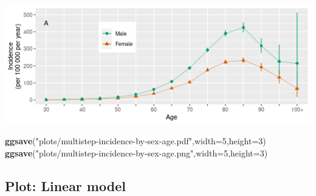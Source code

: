 \documentclass[
]{article}
\newenvironment{Shaded}{\begin{snugshade}}{\end{snugshade}}
\newcommand{\DataTypeTok}[1]{\textcolor[rgb]{0.13,0.29,0.53}{#1}}
\newcommand{\DecValTok}[1]{\textcolor[rgb]{0.00,0.00,0.81}{#1}}
\newcommand{\KeywordTok}[1]{\textcolor[rgb]{0.13,0.29,0.53}{\textbf{#1}}}
\newcommand{\NormalTok}[1]{#1}
\newcommand{\StringTok}[1]{\textcolor[rgb]{0.31,0.60,0.02}{#1}}
\begin{document}
\includegraphics{multistep-model-comparison_files/figure-latex/age-sex-specific-incidence-figure-1.png}

\begin{Shaded}
\begin{Highlighting}[]
\KeywordTok{ggsave}\NormalTok{(}\StringTok{"plots/multistep-incidence-by-sex-age.pdf"}\NormalTok{,}\DataTypeTok{width=}\DecValTok{5}\NormalTok{,}\DataTypeTok{height=}\DecValTok{3}\NormalTok{)}
\KeywordTok{ggsave}\NormalTok{(}\StringTok{"plots/multistep-incidence-by-sex-age.png"}\NormalTok{,}\DataTypeTok{width=}\DecValTok{5}\NormalTok{,}\DataTypeTok{height=}\DecValTok{3}\NormalTok{)}
\end{Highlighting}
\end{Shaded}

\hypertarget{plot-linear-model}{%
\subsection{Plot: Linear model}\label{plot-linear-model}}
\end{document}
